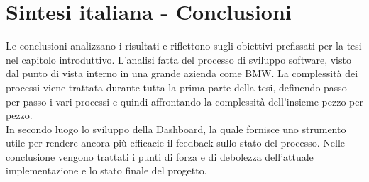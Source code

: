 \documentclass[../main.tex]{subfiles}
\begin{document}
\section{Sintesi italiana - Conclusioni}
Le conclusioni analizzano i risultati e riflettono sugli obiettivi prefissati per la tesi nel capitolo introduttivo. 
L'analisi fatta del processo di sviluppo software, visto dal punto di vista interno in una grande azienda come \gls{BMW}. La complessità dei processi viene trattata durante tutta la prima parte della tesi, definendo passo per passo i vari processi e quindi affrontando la complessità dell'insieme pezzo per pezzo.\\
In secondo luogo lo sviluppo della Dashboard, la quale fornisce uno strumento utile per rendere ancora più efficacie il feedback sullo stato del processo. Nelle conclusione vengono trattati i punti di forza e di debolezza dell'attuale implementazione e lo stato finale del progetto.
\cleardoublepage
\end{document}
